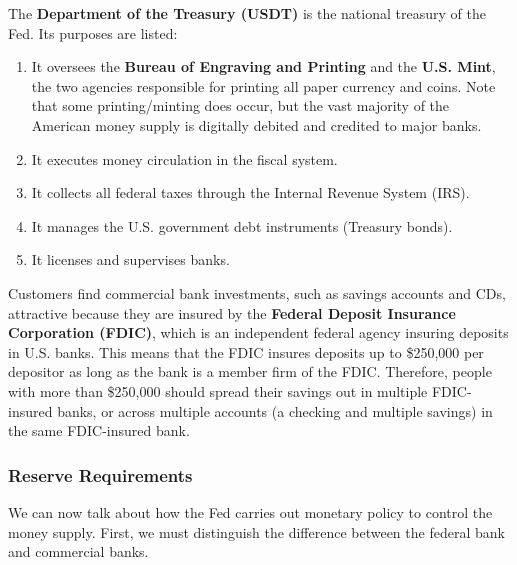 \documentclass{article}
\begin{document}
      \begin{definition}
        The \textbf{Department of the Treasury (USDT)} is the national treasury of the Fed. Its purposes are listed: 
        \begin{enumerate}
          \item It oversees the \textbf{Bureau of Engraving and Printing} and the \textbf{U.S. Mint}, the two agencies responsible for printing all paper currency and coins. Note that some printing/minting does occur, but the vast majority of the American money supply is digitally debited and credited to major banks. 
          \item It executes money circulation in the fiscal system. 
          \item It collects all federal taxes through the Internal Revenue System (IRS). 
          \item It manages the U.S. government debt instruments (Treasury bonds). 
          \item It licenses and supervises banks. 
        \end{enumerate}
      \end{definition}

      \begin{definition}
        Customers find commercial bank investments, such as savings accounts and CDs, attractive because they are insured by the \textbf{Federal Deposit Insurance Corporation (FDIC)}, which is an independent federal agency insuring deposits in U.S. banks. This means that the FDIC insures deposits up to \$250,000 per depositor as long as the bank is a member firm of the FDIC. Therefore, people with more than \$250,000 should spread their savings out in multiple FDIC-insured banks, or across multiple accounts (a checking and multiple savings) in the same FDIC-insured bank. 
      \end{definition}

    \subsubsection{Reserve Requirements}

      We can now talk about how the Fed carries out monetary policy to control the money supply. First, we must distinguish the difference between the federal bank and commercial banks. 
\end{document}
